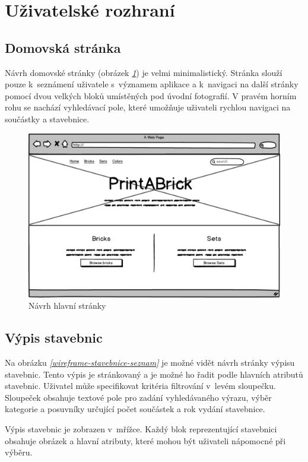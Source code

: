 \section{Uživatelské rozhraní}

\subsection{Domovská stránka}
Návrh domovské stránky (obrázek \emph{\ref{wireframe-hlavni}}) je velmi minimalistický. Stránka slouží pouze k~seznámení uživatele s~významem aplikace a k~navigaci na další stránky pomocí dvou velkých bloků umístěných pod úvodní fotografií. V pravém horním rohu se nachází vyhledávací pole, které umožňuje uživateli rychlou navigaci na součástky a stavebnice.

\begin{figure}[htbp]
    \centering
    \includegraphics[width=\textwidth,height=\textheight,keepaspectratio]{pdfs/wireframe_home.pdf}
    \caption{Návrh hlavní stránky}\label{wireframe-hlavni}
\end{figure}


\subsection{Výpis stavebnic}
Na obrázku \emph{\ref{wireframe-stavebnice-seznam}} je možné vidět návrh stránky výpisu stavebnic. Tento výpis je stránkovaný a je možné ho řadit podle hlavních atributů stavebnic. Uživatel může specifikovat kritéria filtrování v~levém sloupečku. Sloupeček obsahuje textové pole pro zadání vyhledávaného výrazu, výběr kategorie a posuvníky určující počet součástek a rok vydání stavebnice.

Výpis stavebnic je zobrazen v~mřížce. Každý blok reprezentující stavebnici obsahuje obrázek a hlavní atributy, které mohou být uživateli nápomocné při výběru.

